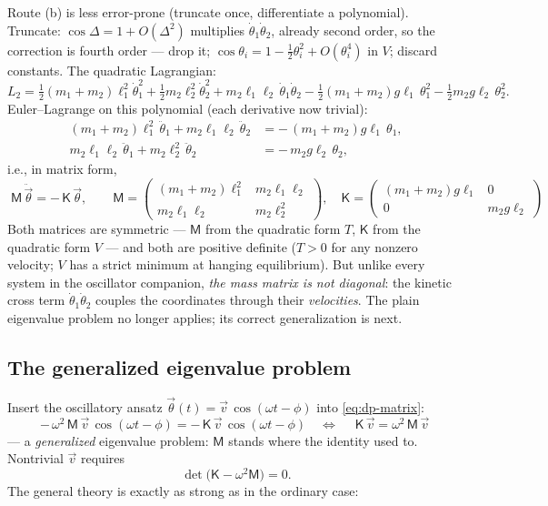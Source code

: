 \documentclass[11pt]{article}
\theoremstyle{plain}
\theoremstyle{definition}
\theoremstyle{remark}
\newcommand{\vth}{\vec{\theta}}
\newcommand{\mM}{\mathsf{M}}
\newcommand{\mK}{\mathsf{K}}
\begin{document}
Route (b) is less error-prone (truncate once, differentiate a polynomial).
Truncate: $\cos\Delta = 1 + O(\Delta^2)$ multiplies
$\dot\theta_1\dot\theta_2$, already second order, so the correction is
fourth order --- drop it; $\cos\theta_i = 1 - \tfrac12\theta_i^2 +
O(\theta_i^4)$ in $V$; discard constants. The quadratic Lagrangian:
\begin{equation}
  L_2 =
  \tfrac12(m_1{+}m_2)\ell_1^2\dot\theta_1^2
  + \tfrac12 m_2\ell_2^2\dot\theta_2^2
  + m_2\ell_1\ell_2\,\dot\theta_1\dot\theta_2
  - \tfrac12(m_1{+}m_2)g\ell_1\,\theta_1^2
  - \tfrac12 m_2 g\ell_2\,\theta_2^2 .
\end{equation}
Euler--Lagrange on this polynomial (each derivative now trivial):
\begin{align}
  (m_1{+}m_2)\ell_1^2\,\ddot\theta_1 + m_2\ell_1\ell_2\,\ddot\theta_2
  &= -\,(m_1{+}m_2)g\ell_1\,\theta_1, \nonumber\\
  m_2\ell_1\ell_2\,\ddot\theta_1 + m_2\ell_2^2\,\ddot\theta_2
  &= -\,m_2 g\ell_2\,\theta_2 ,
\end{align}
i.e., in matrix form,
\begin{equation}
  \boxed{\;
  \mM\,\ddot{\vth} = -\,\mK\,\vth,
  \qquad
  \mM =
  \begin{pmatrix}
    (m_1{+}m_2)\ell_1^2 & m_2\ell_1\ell_2\\
    m_2\ell_1\ell_2 & m_2\ell_2^2
  \end{pmatrix},
  \quad
  \mK =
  \begin{pmatrix}
    (m_1{+}m_2)g\ell_1 & 0\\
    0 & m_2 g\ell_2
  \end{pmatrix}
  \;}
  \label{eq:dp-matrix}
\end{equation}
Both matrices are symmetric --- $\mM$ from the quadratic form $T$, $\mK$
from the quadratic form $V$ --- and both are positive definite ($T > 0$
for any nonzero velocity; $V$ has a strict minimum at hanging
equilibrium). But unlike every system in the oscillator companion,
\emph{the mass matrix is not diagonal}: the kinetic cross term
$\dot\theta_1\dot\theta_2$ couples the coordinates through their
\emph{velocities}. The plain eigenvalue problem no longer applies; its
correct generalization is next.

\subsection{The generalized eigenvalue problem}
\label{sec:gevp}

Insert the oscillatory ansatz $\vth(t) = \vec v\,\cos(\omega t - \phi)$
into \eqref{eq:dp-matrix}:
\begin{equation}
  -\,\omega^2\,\mM\,\vec v\,\cos(\omega t - \phi)
  = -\,\mK\,\vec v\,\cos(\omega t - \phi)
  \quad\Longleftrightarrow\quad
  \boxed{\;\mK\,\vec v = \omega^2\,\mM\,\vec v\;}
  \label{eq:gevp}
\end{equation}
--- a \emph{generalized} eigenvalue problem: $\mM$ stands where the
identity used to. Nontrivial $\vec v$ requires
\begin{equation}
  \det\bigl(\mK - \omega^2 \mM\bigr) = 0 .
\end{equation}
The general theory is exactly as strong as in the ordinary case:
\end{document}
